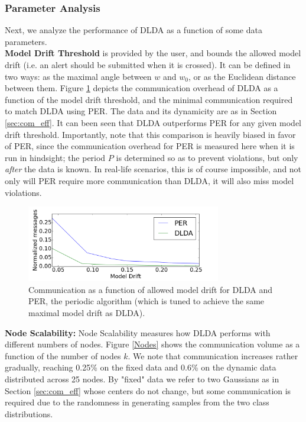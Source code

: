 \subsubsection{Parameter Analysis}\label{sec:paramanal}
Next, we analyze the performance of DLDA as a function of some data parameters.
~~\\
\noindent\textbf{Model Drift Threshold}  is provided by the user, and bounds
the allowed model drift (i.e. an alert should be submitted when it is crossed).
It can be defined in two ways: as the maximal angle between 
$w$ and $w_0$, or as the Euclidean distance between them. 
Figure \ref{PERvsDLDAoverError} depicts the communication overhead of DLDA 
as a function of the model drift threshold, and the minimal communication required to match 
DLDA using PER.	The data and its dynamicity are as in Section \ref{sec:com_eff}.
It can been seen that  DLDA outperforms PER for
any given model drift threshold. Importantly, note that this comparison is
heavily biased in favor of PER, since the communication overhead for
PER is measured here when it is run in hindsight; the period $P$ is determined so as to
prevent violations, but only \textit{after} the data is known. In real-life
scenarios, this is of course impossible, and not only will PER require 
more communication than DLDA, it will also miss model violations.
%
\begin{figure}
        \centering
        \includegraphics[width=85mm]{graphics/onlyDrift.png}
        \caption{Communication as a function of allowed model drift for DLDA and PER, the
        periodic algorithm (which is tuned to achieve the same maximal model drift as DLDA).}
        \label{PERvsDLDAoverError}
\end{figure}
%

\noindent\textbf{Node Scalability:}
Node Scalability measures how DLDA performs with different numbers of nodes.
Figure \ref{Nodes} shows the communication volume as a function of the number of nodes $k$.
We note that communication increases rather gradually, reaching 0.25\% on the fixed
data and 0.6\% on the dynamic data distributed across 25 nodes. By "fixed" data we
refer to two Gaussians as in Section \ref{sec:com_eff} whose centers do not change,
but some communication is required due to the randomness in generating
samples from the two class distributions. 

